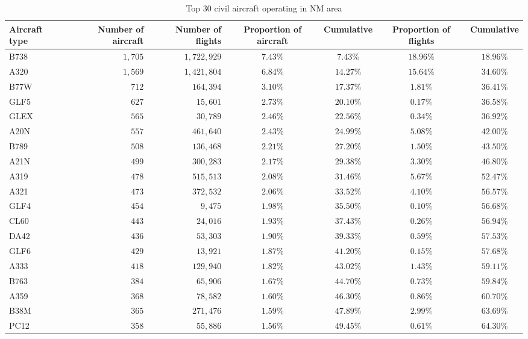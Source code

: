 \documentclass[
  11pt,
  a4paper,
]{book}
\begin{document}
\hypertarget{tbl-fleet-size}{}
\setlength{\LTpost}{0mm}
\begin{longtable}{lrrcccc}
\caption{\label{tbl-fleet-size}Top 30 civil aircraft operating in NM area }\tabularnewline

\toprule
Aircraft type & Number of aircraft & Number of flights & Proportion of aircraft & Cumulative & Proportion of flights & Cumulative \\ 
\midrule
B738 & $1,705$ & $1,722,929$ & $7.43\%$ & $7.43\%$ & $18.96\%$ & $18.96\%$ \\ 
A320 & $1,569$ & $1,421,804$ & $6.84\%$ & $14.27\%$ & $15.64\%$ & $34.60\%$ \\ 
B77W & $712$ & $164,394$ & $3.10\%$ & $17.37\%$ & $1.81\%$ & $36.41\%$ \\ 
GLF5 & $627$ & $15,601$ & $2.73\%$ & $20.10\%$ & $0.17\%$ & $36.58\%$ \\ 
GLEX & $565$ & $30,789$ & $2.46\%$ & $22.56\%$ & $0.34\%$ & $36.92\%$ \\ 
A20N & $557$ & $461,640$ & $2.43\%$ & $24.99\%$ & $5.08\%$ & $42.00\%$ \\ 
B789 & $508$ & $136,468$ & $2.21\%$ & $27.20\%$ & $1.50\%$ & $43.50\%$ \\ 
A21N & $499$ & $300,283$ & $2.17\%$ & $29.38\%$ & $3.30\%$ & $46.80\%$ \\ 
A319 & $478$ & $515,513$ & $2.08\%$ & $31.46\%$ & $5.67\%$ & $52.47\%$ \\ 
A321 & $473$ & $372,532$ & $2.06\%$ & $33.52\%$ & $4.10\%$ & $56.57\%$ \\ 
GLF4 & $454$ & $9,475$ & $1.98\%$ & $35.50\%$ & $0.10\%$ & $56.68\%$ \\ 
CL60 & $443$ & $24,016$ & $1.93\%$ & $37.43\%$ & $0.26\%$ & $56.94\%$ \\ 
DA42 & $436$ & $53,303$ & $1.90\%$ & $39.33\%$ & $0.59\%$ & $57.53\%$ \\ 
GLF6 & $429$ & $13,921$ & $1.87\%$ & $41.20\%$ & $0.15\%$ & $57.68\%$ \\ 
A333 & $418$ & $129,940$ & $1.82\%$ & $43.02\%$ & $1.43\%$ & $59.11\%$ \\ 
B763 & $384$ & $65,906$ & $1.67\%$ & $44.70\%$ & $0.73\%$ & $59.84\%$ \\ 
A359 & $368$ & $78,582$ & $1.60\%$ & $46.30\%$ & $0.86\%$ & $60.70\%$ \\ 
B38M & $365$ & $271,476$ & $1.59\%$ & $47.89\%$ & $2.99\%$ & $63.69\%$ \\ 
PC12 & $358$ & $55,886$ & $1.56\%$ & $49.45\%$ & $0.61\%$ & $64.30\%$ \\ 

\end{longtable}
\end{document}

